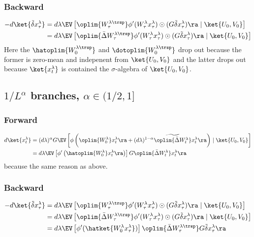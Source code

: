 \subsubsection{Backward}

\begin{align*}
-d\ket{\tilde\delta x_{\tau}^{\lambda}} & =d\lambda\EV\left[\oplim{W_{\tau}^{\lambda\trsp}}\phi'(W_{\tau}^{\lambda}x_{\tau}^{\lambda})\odot(G\tilde\delta x_{\tau}^{\lambda})\ra\mid\ket{U_{0},V_{0}}\right]\\
 & =d\lambda\EV\left[\oplim{\bar{\Delta}W_{\tau}^{\lambda\trsp}}\phi'(W_{\tau}^{\lambda}x_{\tau}^{\lambda})\odot(G\tilde\delta x_{\tau}^{\lambda})\ra\mid\ket{U_{0},V_{0}}\right]
\end{align*}
Here the $\hatoplim{W_{0}^{\lambda\trsp}}$ and $\dotoplim{W_{0}^{\lambda\trsp}}$
drop out because the former is zero-mean and indepenent from $\ket{U_{0},V_{0}}$
and the latter drops out because $\ket{x_{t}^{\lambda}}$ is contained
the $\sigma$-algebra of $\ket{U_{0},V_{0}}$.

\subsection{$1/L^{\alpha}$ branches, $\alpha\in(1/2,1]$}\label{heuristics:smooth_limits}

\subsubsection{Forward}

\begin{align*}
d\ket{x_{t}^{\lambda}} & =(d\lambda)^{\alpha}G\EV\left[\phi\left(\oplim{W_{0}^{\lambda}}x_{t}^{\lambda}\ra+(d\lambda)^{1-\alpha}\widetilde{\oplim{\bar{\Delta}W_{t}^{\lambda}}}x_{t}^{\lambda}\ra\right)\mid\ket{U_{0},V_{0}}\right]\\
 & =d\lambda\EV\left[\phi'\left(\hatoplim{W_{0}^{\lambda}}x_{t}^{\lambda}\ra\right)\right]G\oplim{\bar{\Delta}W_{t}^{\lambda}}x_{t}^{\lambda}\ra
\end{align*}
because the same reason as above.

\subsubsection{Backward}

\begin{align*}
-d\ket{\tilde\delta x_{\tau}^{\lambda}} & =d\lambda\EV\left[\oplim{W_{\tau}^{\lambda\trsp}}\phi'(W_{\tau}^{\lambda}x_{\tau}^{\lambda})\odot(G\tilde\delta x_{\tau}^{\lambda})\ra\mid\ket{U_{0},V_{0}}\right]\\
 & =d\lambda\EV\left[\oplim{\bar{\Delta}W_{\tau}^{\lambda\trsp}}\phi'(W_{\tau}^{\lambda}x_{\tau}^{\lambda})\odot(G\tilde\delta x_{\tau}^{\lambda})\ra\mid\ket{U_{0},V_{0}}\right]\\
 & =d\lambda\EV\left[\phi'(\hatket{W_{0}^{\lambda}x_{\tau}^{\lambda}})\right]\oplim{\bar{\Delta}W_{\tau}^{\lambda\trsp}}G\tilde\delta x_{\tau}^{\lambda}\ra
\end{align*}

